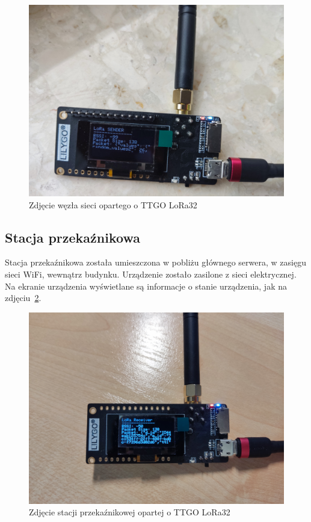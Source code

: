 \begin{figure}[b!]
    \begin{center}
        \includegraphics[width=13cm]{pic/wezel2.jpg}
    \end{center}
    \caption{Zdjęcie węzła sieci opartego o TTGO LoRa32}\label{rys:wezel2}
\end{figure}

\subsection{Stacja przekaźnikowa}
Stacja przekaźnikowa została umieszczona w pobliżu głównego serwera, w zasięgu sieci WiFi, wewnątrz budynku. Urządzenie zostało zasilone z sieci elektrycznej. Na ekranie urządzenia wyświetlane są informacje o stanie urządzenia, jak na zdjęciu~\ref{rys:stacja1}.

\begin{figure}[b!]
    \begin{center}
        \includegraphics[width=13cm]{pic/stacja1.jpg}
    \end{center}
    \caption{Zdjęcie stacji przekaźnikowej opartej o TTGO LoRa32}\label{rys:stacja1}
\end{figure}

